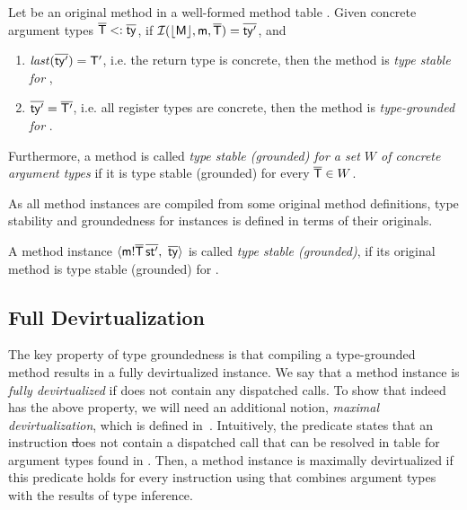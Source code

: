 \begin{definition}\label{def:ground}
  Let \meth{\m}{\ol\ty}{}{\ol\st} be an original method in a well-formed
  method table \mtbl. Given concrete argument types $\overline{\mathsf{T}} <: \overline{\mathsf{ty}}$,
  if $\operatorname{\mathcal{I}}(\lfloor \mathsf{M} \rfloor, \mathsf{m}, \overline{\mathsf{T}}) = \overline{\mathsf{ty}'}$,
  and
  \begin{enumerate}
  \item  $\mathit{last}(\overline{\mathsf{ty}'}) = \mathsf{T}'$, i.e. the return type is concrete, then
    the method is \emph{type stable for \ol\Ty},
  \item $\overline{\mathsf{ty}'} = \overline{\mathsf{T}'}$, i.e. all register types are concrete, then the
    method is \emph{type-grounded for \ol\Ty}.
  \end{enumerate}

  Furthermore, a method is called \emph{type stable (grounded) for a set $W$
  of concrete argument types} if it is type stable (grounded) for every
  $\overline{\mathsf{T}} \in W$.
\end{definition}

As all method instances are compiled from some original method definitions,
type stability and groundedness for instances is defined in terms of their
originals.

\begin{definition}\label{def:ground-inst}
  A method instance $\langle \mathsf{m}!{\overline{\mathsf{T}}}\,{\overline{\mathsf{st}'}},\ \overline{\mathsf{ty}} \rangle$
  is called \emph{type stable (grounded)},
  if its original method \msig\m{\ol\ty} is type stable (grounded) for \ol\Ty.
\end{definition}


\subsection{Full Devirtualization}\label{sec:ground-inst-prop}

The key property of type groundedness is that
compiling a type-grounded method results in a fully devirtualized instance.
We say that a method instance \meth{}\ol{\st} is \emph{fully devirtualized}
if \ol{\st} does not contain any dispatched calls. To show that \jit
indeed has the above property, we will need an additional
notion, \emph{maximal devirtualization}, which is defined
in~. Intuitively, the predicate \devirtst{\ol\ty}{\mtbl}{\st}
states that an instruction \st does not contain a dispatched call
that can be resolved in table \mtbl for argument types found in \ol\ty.
Then, a method instance is maximally devirtualized if this predicate
holds for every instruction using \ol\ty that combines argument types with
the results of type inference.

